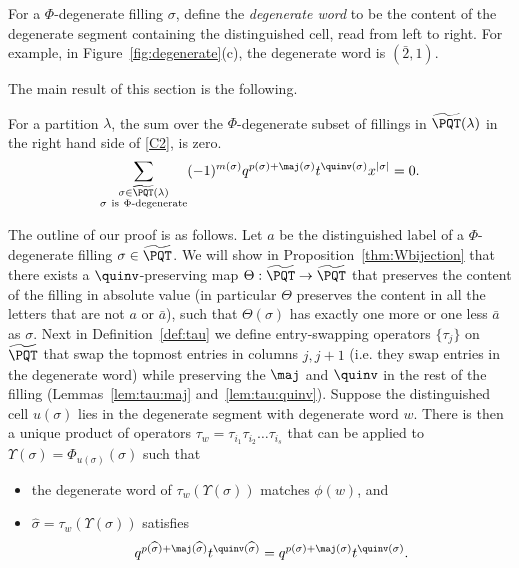 \begin{defn}For a $\Phi$-degenerate filling $\sigma$, define the \emph{degenerate word} to be the content of the degenerate segment containing the distinguished cell, read from left to right. For example, in Figure~\ref{fig:degenerate}(c), the degenerate word is $(\bar{2},1)$.
\end{defn}

The main result of this section is the following.

\begin{theorem}
\label{prop:Phi-degenerate}
For a partition $\lambda$, the sum over the $\Phi$-degenerate subset of fillings in $\widetilde{\PQT}(\lambda)$ in the right hand side of \eqref{C2}, is zero.
\[
\sum_{\substack{\sigma\in\widetilde{\PQT}(\lambda)\\\sigma\ \text{is}\ \Phi\text{-degenerate}}} (-1)^{m(\sigma)} q^{p(\sigma)+\maj(\sigma)}t^{\quinv(\sigma)}x^{|\sigma|} =0.
\]
\end{theorem} 


The outline of our proof is as follows. Let $a$ be the distinguished label of a $\Phi$-degenerate filling $\sigma\in\widetilde{\PQT}$. We will show in Proposition~\ref{thm:Wbijection} that there exists a $\quinv$-preserving map $\Theta:\widetilde{\PQT}\rightarrow \widetilde{\PQT}$ that preserves the content of the filling in absolute value (in particular $\Theta$ preserves the content in all the letters that are not $a$ or $\bar{a}$), such that $\Theta(\sigma)$ has exactly one more or one less $\bar{a}$ as $\sigma$. Next in Definition~\ref{def:tau} we define entry-swapping operators $\{\tau_j\}$ on $\widetilde{\PQT}$ that swap the topmost entries in columns $j,j+1$ (i.e. they swap entries in the degenerate word) while preserving the $\maj$ and $\quinv$ in the rest of the filling (Lemmas~\ref{lem:tau:maj} and~\ref{lem:tau:quinv}). Suppose the distinguished cell $u(\sigma)$ lies in the degenerate segment with degenerate word $w$. There is then a unique product of operators $\tau_w=\tau_{i_1}\tau_{i_2}\ldots\tau_{i_s}$ that can be applied to $\Upsilon(\sigma)=\Phi_{u(\sigma)}(\sigma)$ such that
\begin{itemize}
\item the degenerate word of $\tau_w(\Upsilon(\sigma))$ matches $\phi(w)$, and 
\item $\widehat{\sigma} = \tau_w(\Upsilon(\sigma))$ satisfies 
\[q^{p(\widehat{\sigma})+\maj(\widehat{\sigma})}t^{\quinv(\widehat{\sigma})} = q^{p(\sigma)+\maj(\sigma)}t^{\quinv(\sigma)}.\]
\end{itemize}

